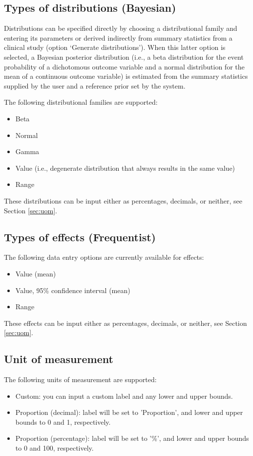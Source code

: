 \documentclass[00_mcda_tutorial.tex]{subfiles}
\begin{document}
\subsection*{Types of distributions (Bayesian)}
Distributions can be specified directly by choosing a distributional family and entering its parameters or derived indirectly from summary statistics from a clinical study (option ‘Generate distributions’). When this latter option is selected, a Bayesian posterior distribution (i.e., a beta distribution for the event probability of a dichotomous outcome variable and a normal distribution for the mean of a continuous outcome variable) is estimated from the summary statistics supplied by the user and a reference prior set by the system.
\newline

\noindent The following distributional families are supported:
\begin{itemize}
\item Beta
\item Normal
\item Gamma
\item Value (i.e., degenerate distribution that always results in the same value)
\item Range
\end{itemize}

\noindent These distributions can be input either as percentages, decimals, or neither, see Section \ref{sec:uom}.
    
\subsection*{Types of effects (Frequentist)}
The following data entry options are currently available for effects:
\begin{itemize}
\item Value (mean)
\item Value, 95\% confidence interval (mean)
\item Range
\end{itemize}

\noindent These effects can be input either as percentages, decimals, or neither, see Section \ref{sec:uom}.
 
\subsection*{Unit of measurement}
\label{sec:uom}
The following units of measurement are supported:
\begin{itemize}
\item Custom: you can input a custom label and any lower and upper bounds.
\item Proportion (decimal): label will be set to 'Proportion', and lower and upper bounds to 0 and 1, respectively.
\item Proportion (percentage): label will be set to '\%', and lower and upper bounds to 0 and 100, respectively.
\end{itemize}
\end{document}
